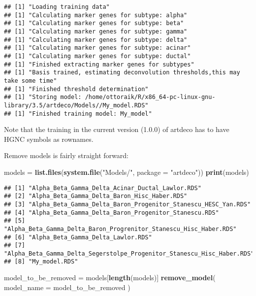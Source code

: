 \documentclass[]{article}
\newenvironment{Shaded}{\begin{snugshade}}{\end{snugshade}}
\newcommand{\KeywordTok}[1]{\textcolor[rgb]{0.13,0.29,0.53}{\textbf{#1}}}
\newcommand{\DataTypeTok}[1]{\textcolor[rgb]{0.13,0.29,0.53}{#1}}
\newcommand{\StringTok}[1]{\textcolor[rgb]{0.31,0.60,0.02}{#1}}
\newcommand{\NormalTok}[1]{#1}
\begin{document}
\begin{verbatim}
## [1] "Loading training data"
## [1] "Calculating marker genes for subtype: alpha"
## [1] "Calculating marker genes for subtype: beta"
## [1] "Calculating marker genes for subtype: gamma"
## [1] "Calculating marker genes for subtype: delta"
## [1] "Calculating marker genes for subtype: acinar"
## [1] "Calculating marker genes for subtype: ductal"
## [1] "Finished extracting marker genes for subtypes"
## [1] "Basis trained, estimating deconvolution thresholds,this may take some time"
## [1] "Finished threshold determination"
## [1] "Storing model: /home/ottoraik/R/x86_64-pc-linux-gnu-library/3.5/artdeco/Models//My_model.RDS"
## [1] "Finished training model: My_model"
\end{verbatim}

Note that the training in the current version (1.0.0) of artdeco has to
have HGNC symbols as rownames.

Remove models is fairly straight forward:

\begin{Shaded}
\begin{Highlighting}[]
\NormalTok{models =}\StringTok{ }\KeywordTok{list.files}\NormalTok{(}\KeywordTok{system.file}\NormalTok{(}\StringTok{"Models/"}\NormalTok{, }\DataTypeTok{package =} \StringTok{"artdeco"}\NormalTok{))}
\KeywordTok{print}\NormalTok{(models)}
\end{Highlighting}
\end{Shaded}

\begin{verbatim}
## [1] "Alpha_Beta_Gamma_Delta_Acinar_Ductal_Lawlor.RDS"                      
## [2] "Alpha_Beta_Gamma_Delta_Baron_Hisc_Haber.RDS"                          
## [3] "Alpha_Beta_Gamma_Delta_Baron_Progenitor_Stanescu_HESC_Yan.RDS"        
## [4] "Alpha_Beta_Gamma_Delta_Baron_Progenitor_Stanescu.RDS"                 
## [5] "Alpha_Beta_Gamma_Delta_Baron_Progrenitor_Stanescu_Hisc_Haber.RDS"     
## [6] "Alpha_Beta_Gamma_Delta_Lawlor.RDS"                                    
## [7] "Alpha_Beta_Gamma_Delta_Segerstolpe_Progenitor_Stanescu_Hisc_Haber.RDS"
## [8] "My_model.RDS"
\end{verbatim}

\begin{Shaded}
\begin{Highlighting}[]
\NormalTok{model_to_be_removed =}\StringTok{ }\NormalTok{models[}\KeywordTok{length}\NormalTok{(models)]}
\KeywordTok{remove_model}\NormalTok{(}
    \DataTypeTok{model_name =}\NormalTok{ model_to_be_removed}
\NormalTok{)}
\end{Highlighting}
\end{Shaded}
\end{document}
